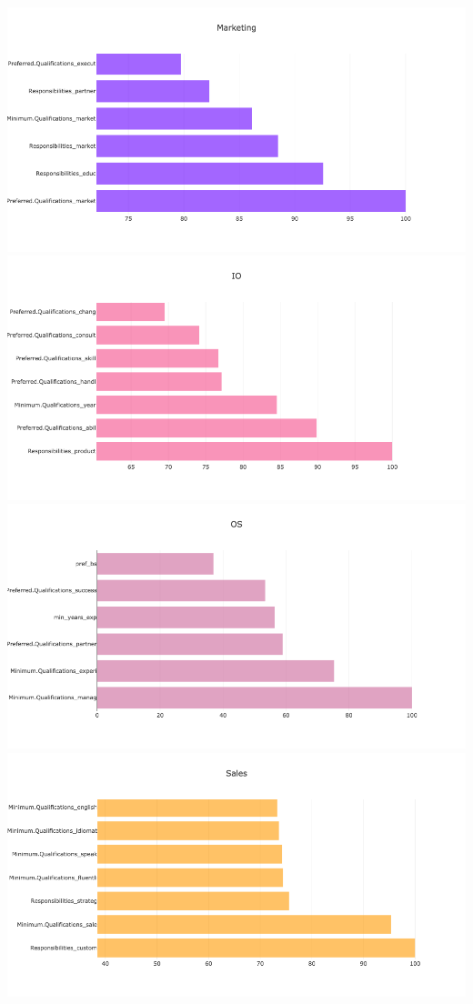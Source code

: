 \documentclass[9.5 pt]{article}
\begin{document}
\includegraphics[scale=.35, trim=8cm 0 0 0cm]{"newplot (3)"}
\includegraphics[scale=.35, trim=4.5cm 0 0 0cm]{"newplot (4)"}
\includegraphics[scale=.35, trim=8cm 0 0 0cm]{"newplot (5)"}
\includegraphics[scale=.35, trim=5cm 0 0 0cm]{"newplot (6)"}
\end{document}
